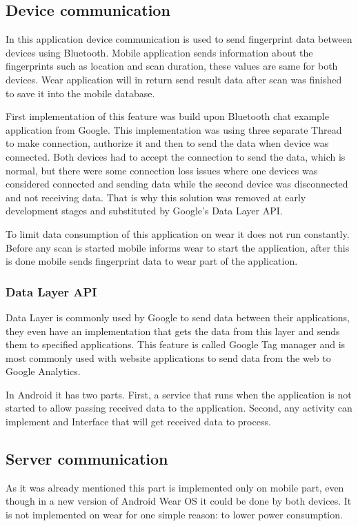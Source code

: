 \subsection{Device communication}\label{subsec:DeviceCommunication}
In this application device communication is used to send fingerprint data between devices using Bluetooth. Mobile application sends information about the fingerprints such as location and scan duration, these values are same for both devices. Wear application will in return send result data after scan was finished to save it into the mobile database.

First implementation of this feature was build upon Bluetooth chat example application from Google. This implementation was using three separate Thread to make connection, authorize it and then to send the data when device was connected. Both devices had to accept the connection to send the data, which is normal, but there were some connection loss issues where one devices was considered connected and sending data while the second device was disconnected and not receiving data. That is why this solution was removed at early development stages and substituted by Google's Data Layer API.

To limit data consumption of this application on wear it does not run constantly. Before any scan is started mobile informs wear to start the application, after this is done mobile sends fingerprint data to wear part of the application.


\subsubsection{Data Layer API}\label{subsec:DataLayerAPI}
Data Layer is commonly used by Google to send data between their applications, they even have an implementation that gets the data from this layer and sends them to specified applications. This feature is called Google Tag manager and is most commonly used with website applications to send data from the web to Google Analytics.

In Android it has two parts. First, a service that runs when the application is not started to allow passing received data to the application. Second, any activity can implement and Interface that will get received data to process.

\subsection{Server communication}\label{subsec:ServerCommunication}
As it was already mentioned this part is implemented only on mobile part, even though in a new version of Android Wear OS it could be done by both devices. It is not implemented on wear for one simple reason: to lower power consumption. 


